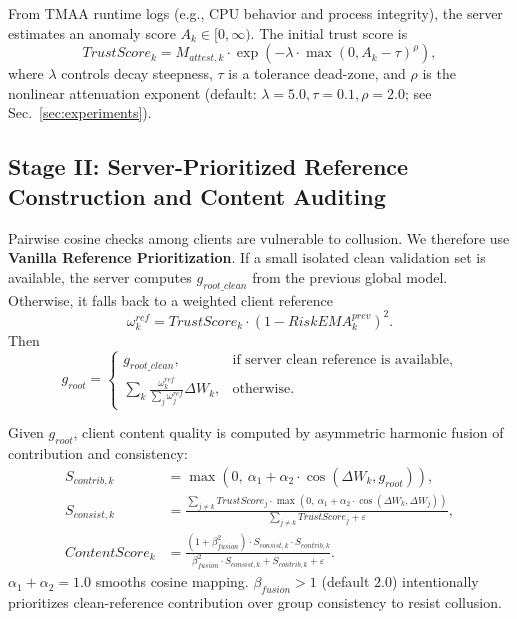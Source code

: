 \documentclass[runningheads]{llncs}
\begin{document}
From TMAA runtime logs (e.g., CPU behavior and process integrity), the server estimates an anomaly score $A_k \in [0,\infty)$. The initial trust score is
\begin{equation}
    TrustScore_{k} = M_{attest,k} \cdot \exp\left(-\lambda \cdot\max(0, A_{k} - \tau)^{\rho}\right),
\end{equation}
where $\lambda$ controls decay steepness, $\tau$ is a tolerance dead-zone, and $\rho$ is the nonlinear attenuation exponent (default: $\lambda=5.0, \tau=0.1, \rho=2.0$; see Sec.~\ref{sec:experiments}).

\subsection{Stage II: Server-Prioritized Reference Construction and Content Auditing}
Pairwise cosine checks among clients are vulnerable to collusion. We therefore use \textbf{Vanilla Reference Prioritization}. If a small isolated clean validation set is available, the server computes $g_{root\_clean}$ from the previous global model. Otherwise, it falls back to a weighted client reference
\begin{equation}
    \omega_{k}^{ref} = TrustScore_{k} \cdot (1 - RiskEMA_{k}^{prev})^{2}.
\end{equation}
Then
\begin{equation}
    g_{root}=
    \begin{cases}
        g_{root\_clean}, & \text{if server clean reference is available}, \\
        \sum_{k} \frac{\omega_{k}^{ref}}{\sum_j \omega_{j}^{ref}} \Delta W_k, & \text{otherwise}.
    \end{cases}
\end{equation}

Given $g_{root}$, client content quality is computed by asymmetric harmonic fusion of contribution and consistency:
\begin{align}
    S_{contrib,k} &= \max\left(0,\ \alpha_{1} + \alpha_{2} \cdot \cos(\Delta W_{k}, g_{root})\right), \\
    S_{consist,k} &= \frac{\sum_{j\neq k} TrustScore_{j} \cdot \max\left(0,\ \alpha_{1} + \alpha_{2} \cdot \cos(\Delta W_{k}, \Delta W_{j})\right)}{\sum_{j\neq k} TrustScore_{j} + \varepsilon}, \\
    ContentScore_{k} &= \frac{(1 + \beta_{fusion}^{2}) \cdot S_{consist,k} \cdot S_{contrib,k}}{\beta_{fusion}^{2}\cdot S_{consist,k} + S_{contrib,k} + \varepsilon}.
\end{align}
$\alpha_1+\alpha_2=1.0$ smooths cosine mapping. $\beta_{fusion}>1$ (default $2.0$) intentionally prioritizes clean-reference contribution over group consistency to resist collusion.
\end{document}
